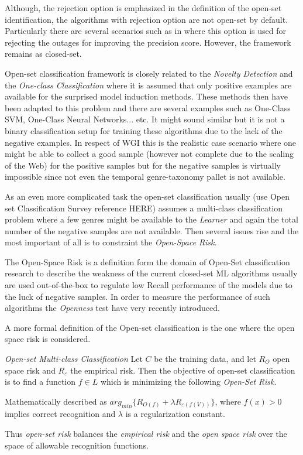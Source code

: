Although, the rejection option is emphasized in the definition of the open-set identification, the algorithms with rejection option are not open-set by default. Particularly there are several scenarios such as in \cite{onan2018ensemble} where this option is used for rejecting the outages for improving the precision score. However, the framework remains as closed-set.

Open-set classification framework is closely related to the \textit{Novelty Detection} and the \textit{One-class Classification} where it is assumed that only positive examples are available for the surprised model induction methods. These methods then have been adapted to this problem and there are several examples such as One-Class SVM, One-Class Neural Networks... etc. It might sound similar but it is not a binary classification setup for training these algorithms due to the lack of the negative examples. In respect of WGI this is the realistic case scenario where one might be able to collect a good sample (however not complete due to the scaling of the Web) for the positive samples but for the negative samples is virtually impossible since not even the temporal genre-taxonomy pallet is not available. 

As an even more complicated task the open-set classification usually (use Open set Classification Survey reference HERE) assumes a multi-class classification problem where a few genres might be available to the \textit{Learner} and again the total number of the negative samples are not available. Then several issues rise and the most important of all is to constraint the \textit{Open-Space Risk}.

The {Open-Space Risk} is a definition form the domain of Open-Set classification research to describe the weakness of the current closed-set ML algorithms usually are used out-of-the-box to regulate low Recall performance of the models due to the luck of negative samples. In order to measure the performance of such algorithms the \textit{Openness} test have very recently introduced. 

A more formal definition of the Open-set classification is the one where the open space risk is considered.

\theoremstyle{definition}
\begin{definition}{\textit{Open-set Multi-class Classification}}
Let $C$ be the training data, and let $R_{O}$ open space risk and $R_{ε}$ the empirical risk. Then the objective of open-set classification is to find a function $f \in L$ which is minimizing the following \textit{Open-Set Risk}. 

Mathematically described as $arg_{min} \{R_{O(f )} + \lambda R_{ε (f (V ))}\}$, where $f (x) > 0$ implies correct recognition and $\lambda$ is a regularization constant.

Thus \textit{open-set risk} balances the \textit{empirical risk} and the \textit{open space risk} over the space of allowable recognition functions\cite{geng2018recent}.
\end{definition}

